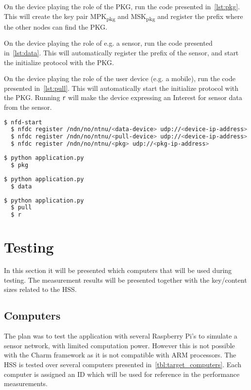 On the device playing the role of the \gls{PKG}, run the code presented in~\autoref{lst:pkg}. 
This will create the key pair MPK\textsubscript{pkg} and MSK\textsubscript{pkg} and register the prefix where the other nodes can find the \gls{PKG}.

On the device playing the role of e.g. a sensor, run the code presented in~\autoref{lst:data}.
This will automatically register the prefix of the sensor, and start the initialize protocol with the \gls{PKG}.

On the device playing the role of the user device (e.g. a mobile), run the code presented in~\autoref{lst:pull}.
This will automatically start the initialize protocol with the \gls{PKG}.
Running \texttt{r} will make the device expressing an Interest for sensor data from the sensor.

\begin{lstlisting}[language=bash, caption={NFD Start}, label={lst:nfd-start}]
  $ nfd-start
  $ nfdc register /ndn/no/ntnu/<data-device> udp://<device-ip-address>
  $ nfdc register /ndn/no/ntnu/<pull-device> udp://<device-ip-address>
  $ nfdc register /ndn/no/ntnu/<pkg> udp://<pkg-ip-address>
\end{lstlisting}

\begin{lstlisting}[language=bash, caption={Start PKG}, label={lst:pkg}]
  $ python application.py
  $ pkg
\end{lstlisting}

\begin{lstlisting}[language=bash, caption={Start a device registering a prefix.}, label={lst:data}]
  $ python application.py
  $ data 
\end{lstlisting}

\begin{lstlisting}[language=bash, caption={Start a device that will express Interest in data.}, label={lst:pull}]
  $ python application.py
  $ pull
  $ r
\end{lstlisting}

\section{Testing}
In this section it will be presented which computers that will be used during testing. 
The measurement results will be presented together with the key/content sizes related to the \gls{HSS}.

\subsection{Computers}
The plan was to test the application with several Raspberry Pi's to simulate a sensor network, with limited computation power.
However this is not possible with the Charm framework as it is not compatible with ARM processors.
The \gls{HSS} is tested over several computers presented in~\autoref{tbl:target_computers}.
Each computer is assigned an ID which will be used for reference in the performance measurements.

